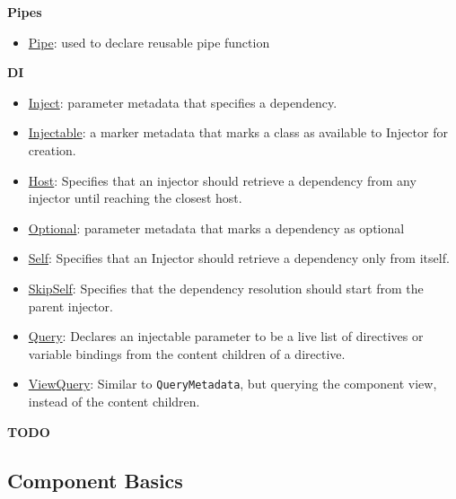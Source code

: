 \documentclass[12pt,]{article}
\providecommand{\tightlist}{%
  \setlength{\itemsep}{0pt}\setlength{\parskip}{0pt}}
\begin{document}
\textbf{Pipes}

\begin{itemize}
\tightlist
\item
  \href{https://angular.io/docs/ts/latest/api/core/PipeMetadata-class.html}{Pipe}:
  used to declare reusable pipe function
\end{itemize}

\textbf{DI}

\begin{itemize}
\tightlist
\item
  \href{https://angular.io/docs/ts/latest/api/core/InjectMetadata-class.html}{Inject}:
  parameter metadata that specifies a dependency.
\item
  \href{https://angular.io/docs/ts/latest/api/core/InjectableMetadata-class.html}{Injectable}:
  a marker metadata that marks a class as available to Injector for
  creation.
\item
  \href{https://angular.io/docs/ts/latest/api/core/HostMetadata-class.html}{Host}:
  Specifies that an injector should retrieve a dependency from any
  injector until reaching the closest host.
\item
  \href{https://angular.io/docs/ts/latest/api/core/OptionalMetadata-class.html}{Optional}:
  parameter metadata that marks a dependency as optional
\item
  \href{https://angular.io/docs/ts/latest/api/core/SelfMetadata-class.html}{Self}:
  Specifies that an Injector should retrieve a dependency only from
  itself.
\item
  \href{https://angular.io/docs/ts/latest/api/core/SkipSelfMetadata-class.html}{SkipSelf}:
  Specifies that the dependency resolution should start from the parent
  injector.
\item
  \href{https://angular.io/docs/ts/latest/api/core/QueryMetadata-class.html}{Query}:
  Declares an injectable parameter to be a live list of directives or
  variable bindings from the content children of a directive.
\item
  \href{https://angular.io/docs/ts/latest/api/core/ViewQueryMetadata-class.html}{ViewQuery}:
  Similar to \texttt{QueryMetadata}, but querying the component view,
  instead of the content children.
\end{itemize}

\textbf{TODO}

\subsection{Component Basics}\label{component-basics}
\end{document}
